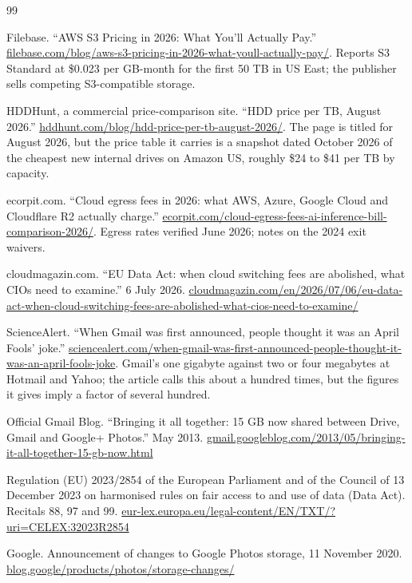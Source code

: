\documentclass[11pt]{article}
\begin{document}
\begin{thebibliography}{99}

 Filebase. ``AWS S3 Pricing in 2026: What You'll Actually Pay.'' \url{filebase.com/blog/aws-s3-pricing-in-2026-what-youll-actually-pay/}. Reports S3 Standard at \$0.023 per GB-month for the first 50 TB in US East; the publisher sells competing S3-compatible storage.

 HDDHunt, a commercial price-comparison site. ``HDD price per TB, August 2026.'' \url{hddhunt.com/blog/hdd-price-per-tb-august-2026/}. The page is titled for August 2026, but the price table it carries is a snapshot dated October 2026 of the cheapest new internal drives on Amazon US, roughly \$24 to \$41 per TB by capacity.

 ecorpit.com. ``Cloud egress fees in 2026: what AWS, Azure, Google Cloud and Cloudflare R2 actually charge.'' \url{ecorpit.com/cloud-egress-fees-ai-inference-bill-comparison-2026/}. Egress rates verified June 2026; notes on the 2024 exit waivers.

 cloudmagazin.com. ``EU Data Act: when cloud switching fees are abolished, what CIOs need to examine.'' 6 July 2026. \url{cloudmagazin.com/en/2026/07/06/eu-data-act-when-cloud-switching-fees-are-abolished-what-cios-need-to-examine/}

 ScienceAlert. ``When Gmail was first announced, people thought it was an April Fools' joke.'' \url{sciencealert.com/when-gmail-was-first-announced-people-thought-it-was-an-april-fools-joke}. Gmail's one gigabyte against two or four megabytes at Hotmail and Yahoo; the article calls this about a hundred times, but the figures it gives imply a factor of several hundred.

 Official Gmail Blog. ``Bringing it all together: 15 GB now shared between Drive, Gmail and Google+ Photos.'' May 2013. \url{gmail.googleblog.com/2013/05/bringing-it-all-together-15-gb-now.html}

 Regulation (EU) 2023/2854 of the European Parliament and of the Council of 13 December 2023 on harmonised rules on fair access to and use of data (Data Act). Recitals 88, 97 and 99. \url{eur-lex.europa.eu/legal-content/EN/TXT/?uri=CELEX:32023R2854}

 Google. Announcement of changes to Google Photos storage, 11 November 2020. \url{blog.google/products/photos/storage-changes/}


\end{thebibliography}
\end{document}
